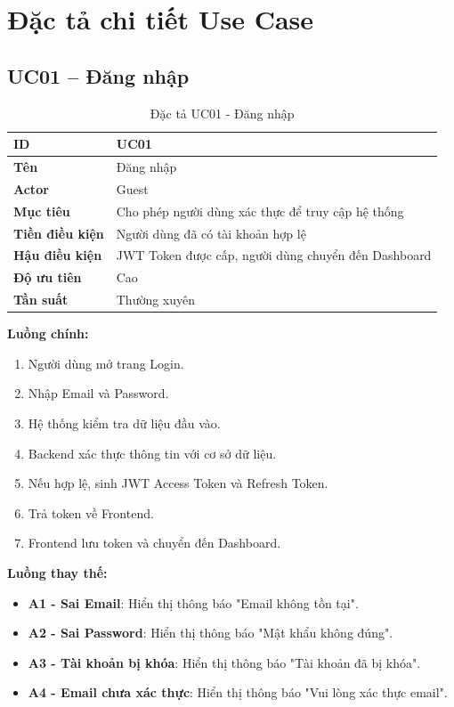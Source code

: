 \documentclass[12pt,a4paper]{report}
\begin{document}
\section{Đặc tả chi tiết Use Case}

\subsection{UC01 -- Đăng nhập}

\begin{table}[H]
\centering
\caption{Đặc tả UC01 - Đăng nhập}
\begin{tabular}{|p{4cm}|p{11cm}|}
\hline
\textbf{ID} & UC01 \\
\hline
\textbf{Tên} & Đăng nhập \\
\hline
\textbf{Actor} & Guest \\
\hline
\textbf{Mục tiêu} & Cho phép người dùng xác thực để truy cập hệ thống \\
\hline
\textbf{Tiền điều kiện} & Người dùng đã có tài khoản hợp lệ \\
\hline
\textbf{Hậu điều kiện} & JWT Token được cấp, người dùng chuyển đến Dashboard \\
\hline
\textbf{Độ ưu tiên} & Cao \\
\hline
\textbf{Tần suất} & Thường xuyên \\
\hline
\end{tabular}
\end{table}

\textbf{Luồng chính:}

\begin{enumerate}
\item Người dùng mở trang Login.
\item Nhập Email và Password.
\item Hệ thống kiểm tra dữ liệu đầu vào.
\item Backend xác thực thông tin với cơ sở dữ liệu.
\item Nếu hợp lệ, sinh JWT Access Token và Refresh Token.
\item Trả token về Frontend.
\item Frontend lưu token và chuyển đến Dashboard.
\end{enumerate}

\textbf{Luồng thay thế:}

\begin{itemize}
\item \textbf{A1 - Sai Email}: Hiển thị thông báo "Email không tồn tại".
\item \textbf{A2 - Sai Password}: Hiển thị thông báo "Mật khẩu không đúng".
\item \textbf{A3 - Tài khoản bị khóa}: Hiển thị thông báo "Tài khoản đã bị khóa".
\item \textbf{A4 - Email chưa xác thực}: Hiển thị thông báo "Vui lòng xác thực email".
\end{itemize}
\end{document}
